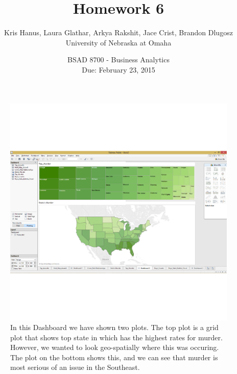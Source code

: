 \documentclass{article}\usepackage[]{graphicx}\usepackage[]{color}
\makeatletter
\def\maxwidth{ %
  \ifdim\Gin@nat@width>\linewidth
    \linewidth
  \else
    \Gin@nat@width
  \fi
}
\newenvironment{knitrout}{}{} %
\makeatother
\begin{document}
\title{Homework 6}
\date{BSAD 8700 - Business Analytics\\ Due: February 23, 2015}
\author{Kris Hanus, Laura Glathar, Arkya Rakshit, Jace Crist, Brandon Dlugosz\\ University of Nebraska at Omaha}
\maketitle

\begin{knitrout}
\color{fgcolor}\begin{figure}[]

\includegraphics[width=\maxwidth]{figure/unnamed-chunk-1-1} \caption[In this Dashboard we have shown two plots]{In this Dashboard we have shown two plots. The top plot is a grid plot that shows top state in which has the highest rates for murder. However, we wanted to look geo-spatially where this was occuring. The plot on the bottom shows this, and we can see that murder is most serious of an issue in the Southeast.\label{fig:unnamed-chunk-1}}
\end{figure}


\end{knitrout}
\end{document}
